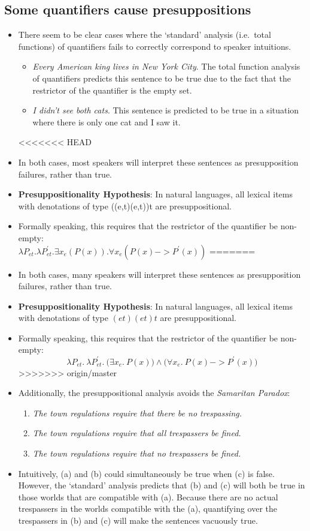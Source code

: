 \documentclass[a4paper]{article}
\begin{document}
\subsection{Some quantifiers cause presuppositions}
\begin{itemize}
\item There seem to be clear cases where the `standard' analysis (i.e.\ total functions) of quantifiers fails to correctly correspond to speaker intuitions.
\begin{itemize}
\item \emph{Every American king lives in New York City}. The total function analysis of quantifiers predicts this sentence to be true due to the fact that the restrictor of the quantifier is the empty set.
\item \emph{I didn't see both cats}. This sentence is predicted to be true in a situation where there is only one cat and I saw it.
\end{itemize}
<<<<<<< HEAD
\item In both cases, most speakers will interpret these sentences as presupposition failures, rather than true. 
\item \textbf{Presuppositionality Hypothesis}: In natural languages, all lexical items with denotations of type ((e,t)(e,t))t are presuppositional.
\item Formally speaking, this requires that the restrictor of the quantifier be non-empty: \\ $\lambda P_{et}.\lambda P^\prime_{et}.\exists x_e (P(x))  .  \forall x_e(P(x) -> P^\prime(x))$ 
=======
\item In both cases, many speakers will interpret these sentences as presupposition failures, rather than true.
\item \textbf{Presuppositionality Hypothesis}: In natural languages, all lexical items with denotations of type $(et)(et)t$ are presuppositional.
\item Formally speaking, this requires that the restrictor of the quantifier be non-empty:
  $$\lambda P_{et}.\ \lambda P^\prime_{et}.\ \Big(\exists x_e.\ P(x)\Big) \land \Big(\forall x_e.\ P(x) -> P^\prime(x)\Big)$$
>>>>>>> origin/master
\item Additionally, the presuppositional analysis avoids the \emph{Samaritan Paradox}:
  \begin{enumerate}
  \item \emph{The town regulations require that there be no trespassing.}
  \item \emph{The town regulations require that all trespassers be fined.}
  \item \emph{The town regulations require that no trespassers be fined.}
  \end{enumerate}
\item Intuitively, (a) and (b) could simultaneously be true when (c) is false. However, the `standard' analysis predicts that (b) and (c) will both be true in those worlds that are compatible with (a). Because there are no actual trespassers in the worlds compatible with the (a), quantifying over the trespassers in (b) and (c) will make the sentences vacuously true.
\end{itemize}
\end{document}
